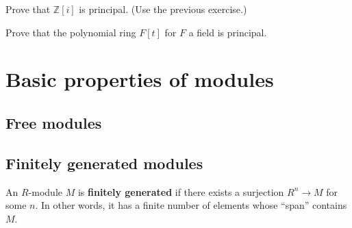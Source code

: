 \begin{exercise} 
Prove that $\mathbb{Z}[i]$ is principal. (Use the previous exercise.)
\end{exercise} 

\begin{exercise} \label{polyringisprincipal}
Prove that the polynomial ring $F[t]$ for $F$ a field is principal. 
\end{exercise} 

\section{Basic properties of modules}

\subsection{Free modules}

\subsection{Finitely generated modules}

\begin{definition} 
An $R$-module $M$ is \textbf{finitely generated} if there exists a surjection
$R^n \to M$ for some $n$. In other words, it has a finite number of elements
whose ``span'' contains $M$.
\end{definition} 


